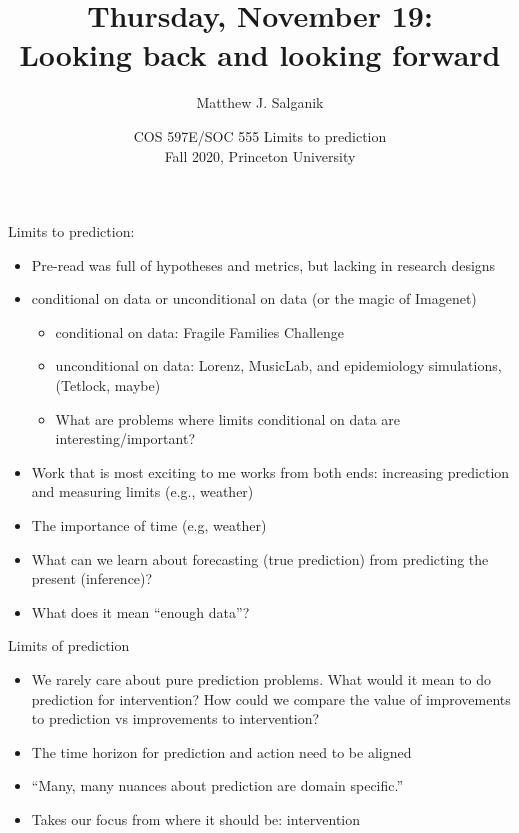 \documentclass[aspectratio=169]{beamer}
\title[]{Thursday, November 19:\\Looking back and looking forward}
\author[]{Matthew J. Salganik}
\institute[]{}
\date[]{COS 597E/SOC 555 Limits to prediction\\Fall 2020, Princeton University}
\begin{document}
\frame{\titlepage}
\begin{frame}

Limits to prediction: 
\begin{itemize}
\item Pre-read was full of hypotheses and metrics, but lacking in research designs \pause
\item conditional on data or unconditional on data (or the magic of Imagenet) \pause
\begin{itemize}
\item conditional on data: Fragile Families Challenge \pause
\item unconditional on data: Lorenz, MusicLab, and epidemiology simulations, (Tetlock, maybe) \pause
\item What are problems where limits conditional on data are interesting/important? \pause
\end{itemize}
\item Work that is most exciting to me works from both ends: increasing prediction and measuring limits (e.g., weather) \pause
\item The importance of time (e.g, weather) \pause
\item What can we learn about forecasting (true prediction) from predicting the present (inference)? \pause 
\item What does it mean ``enough data''? \pause
\end{itemize}

\end{frame}
\begin{frame}

Limits of prediction
\begin{itemize}
\item We rarely care about pure prediction problems. What would it mean to do prediction for intervention? How could we compare the value of improvements to prediction vs improvements to intervention? \pause
\item The time horizon for prediction and action need to be aligned \pause
\item ``Many, many nuances about prediction are domain specific.'' \pause
\item Takes our focus from where it should be: intervention \pause
\end{itemize}

\end{frame}
\end{document}
